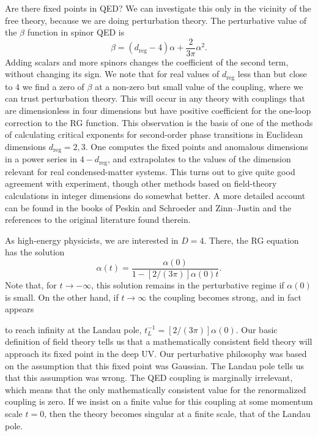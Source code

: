 Are there fixed points in QED? We can investigate this only in the vicinity of
the free theory, because we are doing perturbation theory. The perturbative
value of the $\beta$ function in spinor QED is
\[
  \beta=(d_{\mathrm{reg}}-4)\alpha+\frac{2}{3\pi}\alpha^2.
\]
Adding scalars and more spinors changes the coefficient of the second term,
without changing its sign. We note that for real values of $d_{\mathrm{reg}}$
less than but
close to $4$ we find a zero of $\beta$ at a non-zero but small value of the
coupling, where we can trust perturbation theory. This will occur in any theory
with couplings that are dimensionless in four dimensions but have positive
coefficient for the one-loop correction to the RG function. This observation
is the basis of one of the methods of calculating critical exponents for
second-order phase transitions in Euclidean dimensions $d_{\mathrm{reg}}=2,3$.
One computes the fixed points and anomalous dimensions in a power series in
$4-d_{\mathrm{reg}}$, and extrapolates to the values
of the dimension relevant for real condensed-matter systems. This turns out to
give quite good agreement with experiment, though other methods based on
field-theory calculations in integer dimensions do somewhat better. A more
detailed account can be found in the books of Peskin and Schroeder and
Zinn--Justin \cite{banks-ref-33,banks-ref-111} and the references to the
original literature found therein.

As high-energy physicists, we are interested in $D=4$. There, the RG equation
has the solution
\[
  \alpha(t)=\frac{\alpha(0)}{1-[2/(3\pi)]\alpha(0)t}.
\]
Note that, for $t\to-\infty$, this solution remains in the perturbative regime
if $\alpha(0)$ is small. On the other hand, if $t\to\infty$ the coupling
becomes strong, and in fact appears

to reach infinity at the Landau pole, $t_L^{-1}=[2/(3\pi)]\alpha(0)$. Our
basic definition of field theory tells us that a mathematically consistent
field theory will approach its fixed point in the deep UV. Our perturbative
philosophy was based on the assumption that this fixed point was Gaussian. The
Landau pole tells us that this assumption was wrong. The QED coupling is
marginally irrelevant, which means that the only mathematically consistent
value for the renormalized coupling is zero. If we insist on a finite value for
this coupling at some momentum scale $t=0$, then the theory becomes singular at
a finite scale, that of the Landau pole.

